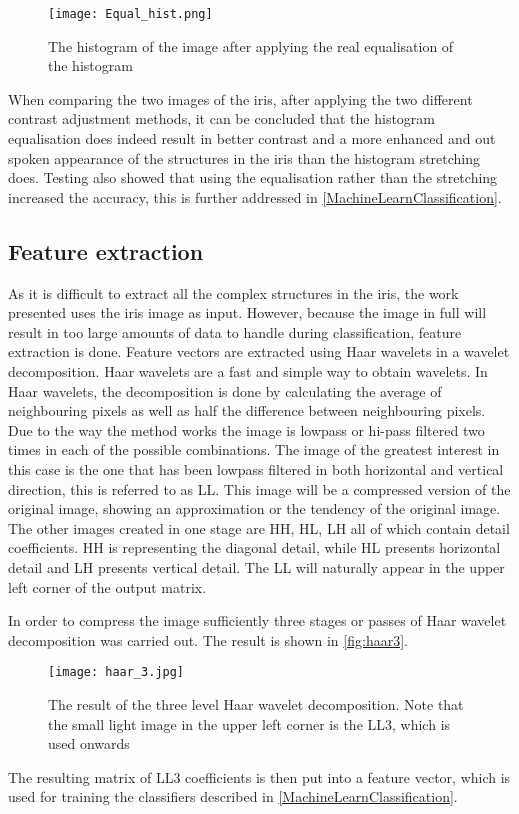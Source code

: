 \begin{figure}[h]
\centering
\texttt{[image: Equal\_hist.png]}
\caption{The histogram of the image after applying the real equalisation of the histogram}
\label{fig:histEQ}
\end{figure}

When comparing the two images of the iris, after applying the two different contrast adjustment methods, it can be concluded that the histogram equalisation does indeed result in better contrast and a more enhanced and out spoken appearance of the structures in the iris than the histogram stretching does. Testing also showed that using the equalisation rather than the stretching increased the accuracy, this is further addressed in \autoref{MachineLearnClassification}. 

\subsection{Feature extraction}
As it is difficult to extract all the complex structures in the iris, the work presented uses the iris image as input. However, because the image in full will result in too large amounts of data to handle during classification, feature extraction is done. Feature vectors are extracted using Haar wavelets in a wavelet decomposition. 
Haar wavelets are a fast and simple way to obtain wavelets. In Haar wavelets, the decomposition is done by calculating the average of neighbouring pixels as well as half the difference between neighbouring pixels. Due to the way the method works the image is lowpass or hi-pass filtered two times in each of the possible combinations. The image of the greatest interest in this case is the one that has been lowpass filtered in both horizontal and vertical direction, this is referred to as LL. This image will be a compressed version of the original image, showing an approximation or the tendency of the original image. The other images created in one stage are HH, HL, LH all of which contain detail coefficients. HH is representing the diagonal detail, while HL presents horizontal detail and LH presents vertical detail. The LL will naturally appear in the upper left corner of the output matrix. 

In order to compress the image sufficiently three stages or passes of Haar wavelet decomposition was carried out. The result is shown in \autoref{fig:haar3}. 

\begin{figure}[H]
\centering
\texttt{[image: haar\_3.jpg]}
\caption{The result of the three level Haar wavelet decomposition. Note that the small light image in the upper left corner is the LL3, which is used onwards}
\label{fig:haar3}
\end{figure}
The resulting matrix of LL3 coefficients is then put into a feature vector, which is used for training the classifiers described in \autoref{MachineLearnClassification}.
